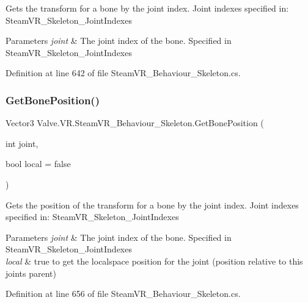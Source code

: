 Gets the transform for a bone by the joint index. Joint indexes specified in\+: Steam\+V\+R\+\_\+\+Skeleton\+\_\+\+Joint\+Indexes 


\begin{DoxyParams}{Parameters}
{\em joint} & The joint index of the bone. Specified in Steam\+V\+R\+\_\+\+Skeleton\+\_\+\+Joint\+Indexes\\
\hline
\end{DoxyParams}


Definition at line 642 of file Steam\+V\+R\+\_\+\+Behaviour\+\_\+\+Skeleton.\+cs.

\mbox{\label{class_valve_1_1_v_r_1_1_steam_v_r___behaviour___skeleton_ac94d3f838396d2d5e8db90a620621011}} 
\subsubsection{\texorpdfstring{GetBonePosition()}{GetBonePosition()}}
{\footnotesize\ttfamily Vector3 Valve.\+V\+R.\+Steam\+V\+R\+\_\+\+Behaviour\+\_\+\+Skeleton.\+Get\+Bone\+Position (\begin{DoxyParamCaption}\item[{int}]{joint,  }\item[{bool}]{local = {\ttfamily false} }\end{DoxyParamCaption})}



Gets the position of the transform for a bone by the joint index. Joint indexes specified in\+: Steam\+V\+R\+\_\+\+Skeleton\+\_\+\+Joint\+Indexes 


\begin{DoxyParams}{Parameters}
{\em joint} & The joint index of the bone. Specified in Steam\+V\+R\+\_\+\+Skeleton\+\_\+\+Joint\+Indexes\\
\hline
{\em local} & true to get the localspace position for the joint (position relative to this joint\textquotesingle{}s parent)\\
\hline
\end{DoxyParams}


Definition at line 656 of file Steam\+V\+R\+\_\+\+Behaviour\+\_\+\+Skeleton.\+cs.

\mbox{\label{class_valve_1_1_v_r_1_1_steam_v_r___behaviour___skeleton_aab0d8d5d9b90db006755859f2bc9c7c7}} 
